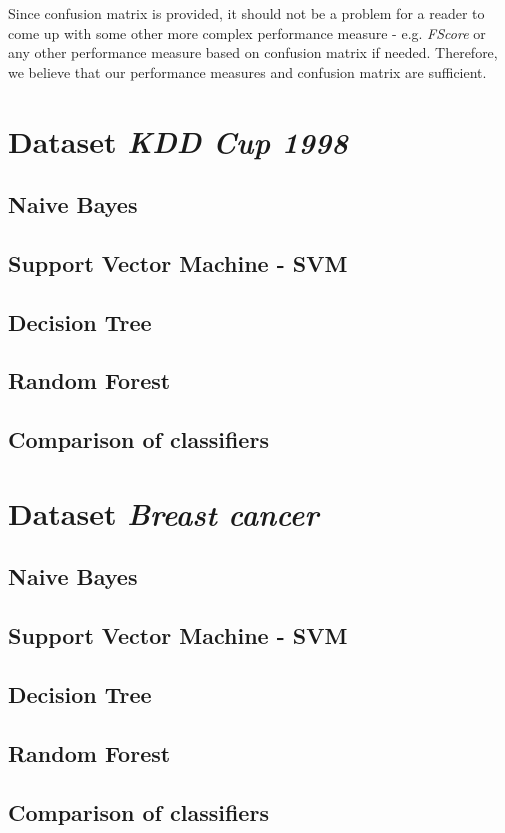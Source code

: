 \documentclass[11pt,a4paper,titlepage]{article}
\begin{document}
Since confusion matrix is provided, it should not be a problem for a reader to come up with some other more complex performance measure - e.g. \textit{FScore} or any other performance measure based on confusion matrix if needed. Therefore, we believe that our performance measures and confusion matrix are sufficient.
\section{Dataset \textit{KDD Cup 1998}}
\subsection{Naive Bayes}
\subsection{Support Vector Machine - SVM}
\subsection{Decision Tree}
\subsection{Random Forest}
\subsection{Comparison of classifiers}

\section{Dataset \textit{Breast cancer}}
\subsection{Naive Bayes}
\subsection{Support Vector Machine - SVM}
\subsection{Decision Tree}
\subsection{Random Forest}
\subsection{Comparison of classifiers}
\end{document}
